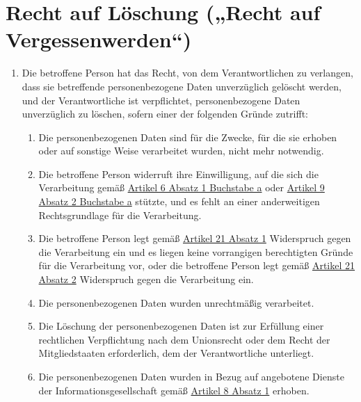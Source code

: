 \chapter{Recht auf Löschung („Recht auf Vergessenwerden“)}
\label{ch:17}


\begin{enumerate}

  \item Die betroffene Person hat das Recht, von dem Verantwortlichen zu verlangen, dass sie betreffende
   personenbezogene Daten unverzüglich gelöscht werden, und der Verantwortliche ist verpflichtet, personenbezogene
   Daten unverzüglich zu löschen, sofern einer der folgenden Gründe zutrifft:
  \label{itm:17-1}

  \begin{enumerate}
  
    \item Die personenbezogenen Daten sind für die Zwecke, für die sie erhoben oder auf sonstige Weise verarbeitet
     wurden, nicht mehr notwendig.
    \label{itm:17-1a}

    \item Die betroffene Person widerruft ihre Einwilligung, auf die sich die Verarbeitung gemäß \hyperref[itm:06-1a]
     {Artikel 6 Absatz 1 Buchstabe a} oder \hyperref[itm:09-2a]{Artikel 9 Absatz 2 Buchstabe a} stützte, und es fehlt
     an einer anderweitigen Rechtsgrundlage für die Verarbeitung.
    \label{itm:17-1b}

    \item Die betroffene Person legt gemäß \hyperref[itm:21-1]{Artikel 21 Absatz 1} Widerspruch gegen die Verarbeitung
     ein und es liegen keine vorrangigen berechtigten Gründe für die Verarbeitung vor, oder die betroffene Person legt
     gemäß \hyperref[itm:21-2]{Artikel 21 Absatz 2} Widerspruch gegen die Verarbeitung ein.
    \label{itm:17-1c}

    \item Die personenbezogenen Daten wurden unrechtmäßig verarbeitet.
    \label{itm:17-1d}

    \item Die Löschung der personenbezogenen Daten ist zur Erfüllung einer rechtlichen Verpflichtung nach dem
     Unionsrecht oder dem Recht der Mitgliedstaaten erforderlich, dem der Verantwortliche unterliegt.
    \label{itm:17-1e}

    \item Die personenbezogenen Daten wurden in Bezug auf angebotene Dienste der Informationsgesellschaft gemäß
     \hyperref[itm:08-1]{Artikel 8 Absatz 1} erhoben.
    \label{itm:17-1f}


\end{enumerate}
\end{enumerate}
